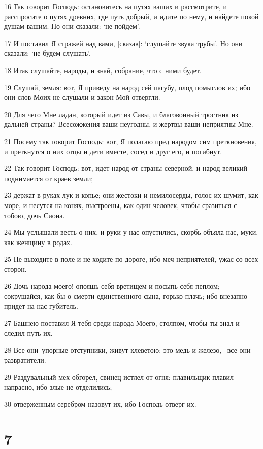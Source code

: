 \par 16 Так говорит Господь: остановитесь на путях ваших и рассмотрите, и расспросите о путях древних, где путь добрый, и идите по нему, и найдете покой душам вашим. Но они сказали: `не пойдем'.
\par 17 И поставил Я стражей над вами, [сказав]: `слушайте звука трубы'. Но они сказали: `не будем слушать'.
\par 18 Итак слушайте, народы, и знай, собрание, что с ними будет.
\par 19 Слушай, земля: вот, Я приведу на народ сей пагубу, плод помыслов их; ибо они слов Моих не слушали и закон Мой отвергли.
\par 20 Для чего Мне ладан, который идет из Савы, и благовонный тростник из дальней страны? Всесожжения ваши неугодны, и жертвы ваши неприятны Мне.
\par 21 Посему так говорит Господь: вот, Я полагаю пред народом сим преткновения, и преткнутся о них отцы и дети вместе, сосед и друг его, и погибнут.
\par 22 Так говорит Господь: вот, идет народ от страны северной, и народ великий поднимается от краев земли;
\par 23 держат в руках лук и копье; они жестоки и немилосерды, голос их шумит, как море, и несутся на конях, выстроены, как один человек, чтобы сразиться с тобою, дочь Сиона.
\par 24 Мы услышали весть о них, и руки у нас опустились, скорбь объяла нас, муки, как женщину в родах.
\par 25 Не выходите в поле и не ходите по дороге, ибо меч неприятелей, ужас со всех сторон.
\par 26 Дочь народа моего! опояшь себя вретищем и посыпь себя пеплом; сокрушайся, как бы о смерти единственного сына, горько плачь; ибо внезапно придет на нас губитель.
\par 27 Башнею поставил Я тебя среди народа Моего, столпом, чтобы ты знал и следил путь их.
\par 28 Все они--упорные отступники, живут клеветою; это медь и железо, --все они развратители.
\par 29 Раздувальный мех обгорел, свинец истлел от огня: плавильщик плавил напрасно, ибо злые не отделились;
\par 30 отверженным серебром назовут их, ибо Господь отверг их.

\chapter{7}

